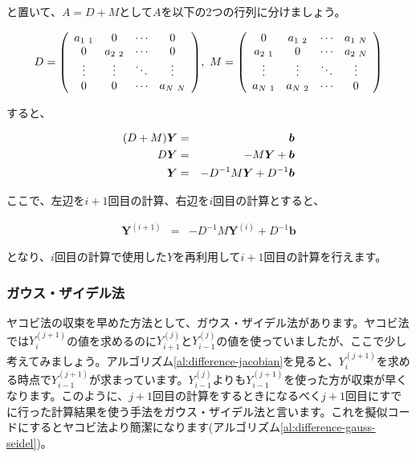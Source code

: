 \noindent
と置いて、$A=D+M$として$A$を以下の2つの行列に分けましょう。

\begin{eqnarray}
    D=\pqty{\begin{array}{cccc}
        a_{1\ 1} & 0 & \cdots & 0 \\
        0 & a_{2\ 2} & \cdots & 0 \\
        \vdots & \vdots & \ddots & \vdots \\
        0 & 0 & \cdots & a_{N\ N}
        \end{array}},\ 
    M=\pqty{\begin{array}{cccc}
        0 & a_{1\ 2} & \cdots & a_{1\ N} \\
        a_{2\ 1} & 0 & \cdots & a_{2\ N} \\
        \vdots & \vdots & \ddots & \vdots \\
        a_{N\ 1} & a_{N\ 2} & \cdots & 0
        \end{array}}
\end{eqnarray}

すると、

\begin{eqnarray}
    (D+M)\boldsymbol{Y}&=&\boldsymbol{b} \\
    D\boldsymbol{Y}&=&-M\boldsymbol{Y}+\boldsymbol{b} \nonumber \\
    \boldsymbol{Y}&=&-D^{-1}M\boldsymbol{Y}+D^{-1}\boldsymbol{b} \setcounter{equation}{72}
\end{eqnarray}

ここで、左辺を$i+1$回目の計算、右辺を$i$回目の計算とすると、

\begin{eqnarray}
    \boldsymbol{Y}^{(i+1)}&=&-D^{-1}M\boldsymbol{Y}^{(i)}+D^{-1}\boldsymbol{b}
\end{eqnarray}

\noindent
となり、$i$回目の計算で使用した$Y$を再利用して$i+1$回目の計算を行えます。








\subsubsection{ガウス・ザイデル法}
\label{gauss-seidel}
ヤコビ法の収束を早めた方法として、ガウス・ザイデル法があります。ヤコビ法では$Y_i^{(j+1)}$の値を求めるのに$Y_{i+1}^{(j)}$と$Y_{i-1}^{(j)}$の値を使っていましたが、ここで少し考えてみましょう。アルゴリズム\ref{al:difference-jacobian}を見ると、$Y_i^{(j+1)}$を求める時点で$Y_{i-1}^{(j+1)}$が求まっています。$Y_{i-1}^{(j)}$よりも$Y_{i-1}^{(j+1)}$を使った方が収束が早くなります。このように、$j+1$回目の計算をするときになるべく$j+1$回目にすでに行った計算結果を使う手法をガウス・ザイデル法と言います。これを擬似コードにするとヤコビ法より簡潔になります(アルゴリズム\ref{al:difference-gauss-seidel})。

